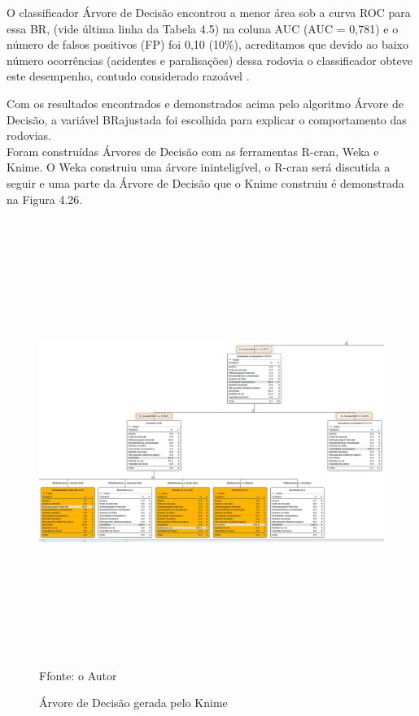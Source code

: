 O classificador Árvore de Decisão encontrou a menor área sob a curva ROC para essa BR, (vide última linha da Tabela 4.5) na coluna AUC (AUC = 0,781) e o número de falsos positivos (FP) foi 0,10 (10\%), acreditamos que devido ao baixo número ocorrências (acidentes e paralisações) dessa rodovia o classificador obteve este desempenho, contudo considerado razoável \cite{ROC}.

Com os resultados encontrados e demonstrados acima pelo algoritmo Árvore de Decisão, a variável BRajustada foi escolhida para explicar o comportamento das rodovias. 
\\
Foram construídas Árvores de Decisão com as ferramentas R-cran, Weka e Knime. O Weka construiu uma árvore ininteligível, o R-cran será discutida a seguir e uma parte da Árvore de Decisão que o Knime construiu é demonstrada na Figura 4.26.


\begin{figure}[!ht]
\centering
\caption{Árvore de Decisão gerada pelo Knime}
\includegraphics[width=150mm, height=145mm]{Figuras/Metodologia/arvoreKnime.png}
\\
\tiny Ffonte: o Autor
\label{fig:arvoreKnime}
\end{figure}

